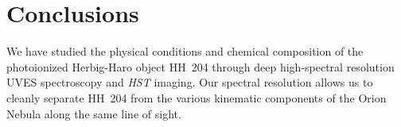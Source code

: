 \documentclass[twocolumn,linenumbers]{aastex63}
\begin{document}













\section{Conclusions}
\label{sec:conc}

We have studied the physical conditions and chemical composition of the photoionized Herbig-Haro object HH~204 through deep high-spectral resolution UVES spectroscopy and \textit{HST} imaging.  
Our spectral resolution allows us to cleanly separate HH~204 from the various kinematic components of the Orion Nebula along the same line of sight.
\end{document}
